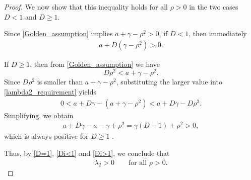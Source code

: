 \documentclass[11pt]{article}
\theoremstyle{definition}
\begin{document}
\begin{proof}
We now show that this inequality holds for all $\rho>0$ in the two cases $D<1$ and $D\ge 1$.

Since \eqref{Golden_assumption} implies $a+\gamma-\rho^2>0$, if $D<1$, then immediately
\begin{align}\label{Di<1}
    a + D(\gamma - \rho^2) > 0.
\end{align}

If $D\ge 1$, then from \eqref{Golden_assumption} we have
\[
    D\rho^2 < a+\gamma-\rho^2.
\]
Since $D\rho^2$ is smaller than $a+\gamma-\rho^2$, substituting the larger value into \eqref{lambda2_requirement} yields
\begin{align}
    0 < a + D\gamma - (a + \gamma - \rho^2)
    < a + D\gamma - D\rho^2.
\end{align}
Simplifying, we obtain
\begin{align}\label{Di>1}
    a + D\gamma - a - \gamma + \rho^2
    = \gamma(D-1) + \rho^2 > 0,
\end{align}
which is always positive for $D\ge1$ .

Thus, by \eqref{D=1}, \eqref{Di<1} and \eqref{Di>1}, we conclude that
\begin{align}
    \lambda_2 > 0 
    \qquad\text{for all } \rho>0.
\end{align}
\end{proof}
\end{document}
